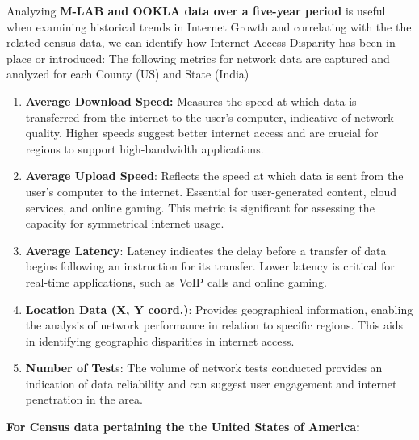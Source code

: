 \documentclass[conference]{IEEEtran}
\begin{document}
Analyzing \textbf{M-LAB and OOKLA data over a five-year period} is useful when examining historical trends in Internet Growth and correlating with the the related census data, we can identify how Internet Access Disparity has been in-place or introduced: The following metrics for network data are captured and analyzed for each County (US) and State (India)

\begin{enumerate}
    \item \textbf{Average Download Speed:} Measures the speed at which data is transferred from the internet to the user's computer, indicative of network quality. Higher speeds suggest better internet access and are crucial for regions to support high-bandwidth applications.
    \item \textbf{Average Upload Speed}: Reflects the speed at which data is sent from the user's computer to the internet. Essential for user-generated content, cloud services, and online gaming. This metric is significant for assessing the capacity for symmetrical internet usage.
    \item \textbf{Average Latency}: Latency indicates the delay before a transfer of data begins following an instruction for its transfer. Lower latency is critical for real-time applications, such as VoIP calls and online gaming.
    \item \textbf{Location Data (X, Y coord.)}: Provides geographical information, enabling the analysis of network performance in relation to specific regions. This aids in identifying geographic disparities in internet access.
    \item \textbf{Number of Test}s: The volume of network tests conducted provides an indication of data reliability and can suggest user engagement and internet penetration in the area.
\end{enumerate}

\textbf{For Census data pertaining the the United States of America:}
\end{document}
